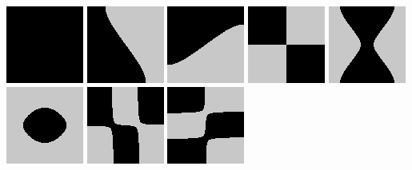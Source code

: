 \includegraphics{o/dchladni_001.png}
\includegraphics{o/dchladni_002.png}
\includegraphics{o/dchladni_003.png}
\includegraphics{o/dchladni_004.png}
\includegraphics{o/dchladni_005.png}
\includegraphics{o/dchladni_006.png}
\includegraphics{o/dchladni_007.png}
\includegraphics{o/dchladni_008.png}

